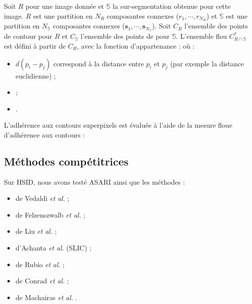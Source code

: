Soit $R$  pour une image donnée et $\mathbb{S}$  la sur-segmentation obtenue pour cette image. $R$ est une partition en $N_{R}$ composantes connexes ($r_{1}, \cdots, r_{N_{R}}$) et $\mathbb{S}$ est une partition en $N_{\mathbb{S}}$ composantes connexes ($\mathbf{s}_{1}, \cdots, \mathbf{s}_{N_{\mathbb{S}}}$). Soit $C_{R}$  l'ensemble des points de contour pour $R$ et $C_{\mathbb{S}}$ l'ensemble des points de  pour $\mathbb{S}$. L'ensemble flou $C_{R \cap \mathbb{S}}^{*}$ est défini à partir de $C_{R}$, avec la fonction d'appartenance :
où  :
\begin{itemize}
\item $d(p_{i}-p_{j})$ correspond à la distance entre $p_{i}$  et $p_{j}$  (par exemple la distance euclidienne) ;
\item {} ;
\item {}. 
\end{itemize}

 L'adhérence aux contours  superpixels est évaluée à l'aide de la mesure floue d'adhérence aux contours :



\subsection{Méthodes compétitrices}

Sur HSID, nous avons testé ASARI ainsi que les méthodes :
\begin{itemize}
\item de Vedaldi \textit{et al.} \cite{vedaldi2008quick} ;
\item de Felzenszwalb \textit{et al.} \cite{felzenszwalb2004efficient} ;
\item de Liu \textit{et al.} \cite{liu2011entropy} ;
\item d'Achanta \textit{et al.} (SLIC) \cite{achanta2012slic} ;
\item de Rubio \textit{et al.} \cite{rubio2016bass} ;
\item de Conrad \textit{et al.}  \cite{conrad2013contour} ;
\item de Machairas \textit{et al.} \cite{machairas2015waterpixels}.
\end{itemize}

